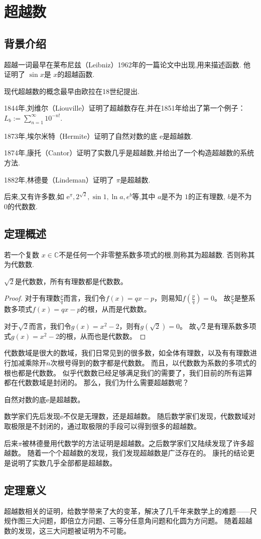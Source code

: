 \documentclass[main]{subfiles}
\begin{document}
\renewcommand{\filename}{No.17Theorem}%
\section{超越数}
\subsection{背景介绍}
超越一词最早在莱布尼兹（Leibniz）1962年的一篇论文中出现,用来描述函数.
他证明了 \(\sin x\)是 \(x\)的超越函数.

现代超越数的概念最早由欧拉在18世纪提出.

1844年,刘维尔（Liouville）证明了超越数存在,并在1851年给出了第一个例子：
\(L_b:=\sum_{n=1}^{\infty} 10^{-n!}\).

1873年,埃尔米特（Hermite）证明了自然对数的底 \(\mathrm{e}\)是超越数.

1874年,康托（Cantor）证明了实数几乎是超越数,并给出了一个构造超越数的系统方法.

1882年,林德曼（Lindeman）证明了 \(\pi\)是超越数.

后来,又有许多数,如 \(\mathrm{e}^\pi,2^{\sqrt{2}},\sin 1,\ln a,e^b\)等,其中 \(a\)是不为 \(1\)的正有理数, \(b\)是不为 \(0\)的代数数.
\subsection{定理概述}
\begin{definition}\label{def:1}
  若一个复数 \(x \in \mathbb{C}\)不是任何一个非零整系数多项式的根,则称其为超越数.
  否则称其为代数数.
\end{definition}
\begin{theorem}\label{the:1}
  \(\sqrt{2}\)是代数数，所有有理数都是代数数。
\end{theorem}
\begin{proof}
  对于有理数\(\frac{p}{q}\)而言，我们令\(f(x)=qx-p\)，则易知\(f(\frac{p}{q})=0\)。
  故\(\frac{p}{q}\)是整系数多项式\(f(x)=qx-p\)的根，从而是代数数。

  对于\(\sqrt{2}\)而言，我们令\(g(x)=x^2-2\)，则有\(g(\sqrt{2})=0\)。
  故\(\sqrt{2}\)是有理系数多项式\(g(x)=x^2-2\)的根，从而也是代数数。
\end{proof}

代数数域是很大的数域，我们日常见到的很多数，如全体有理数，以及有有理数进行加减乘除开\(n\)次根号得到的数字都是代数数。
而且，以代数数为系数的多项式的根也都是代数数。
似乎代数数已经足够满足我们的需要了，我们目前的所有运算都在代数数域是封闭的。
那么，我们为什么需要超越数呢？
\begin{theorem}\label{the:2}
  自然对数的底\(\mathrm{e}\)是超越数。
\end{theorem}
数学家们先后发现\(\mathrm{e}\)不仅是无理数，还是超越数。
随后数学家们发现，代数数域对取极限是不封闭的，通过取极限的手段可以得到很多的超越数。

后来\(\pi\)被林德曼用代数学的方法证明是超越数。之后数学家们又陆续发现了许多超越数。
随着一个个超越数的发现，我们发现超越数是广泛存在的。
康托的结论更是说明了实数几乎全部都是超越数。

\subsection{定理意义}
超越数相关的证明，给数学带来了大的变革，解决了几千年来数学上的难题——尺规作图三大问题，即倍立方问题、三等分任意角问题和化圆为方问题。
随着超越数的发现，这三大问题被证明为不可能。
\end{document}

